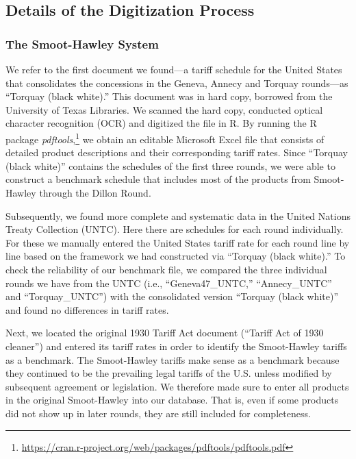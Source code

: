 \documentclass[
  12pt,
]{article}
\begin{document}
\newpage

\hypertarget{digdetails}{%
\subsection{Details of the Digitization Process}\label{digdetails}}

\hypertarget{the-smoot-hawley-system}{%
\subsubsection{The Smoot-Hawley System}\label{the-smoot-hawley-system}}

We refer to the first document we found---a tariff schedule for the United States that consolidates the concessions in the Geneva, Annecy and Torquay rounds---as ``Torquay (black white).'' This document was in hard copy, borrowed from the University of Texas Libraries. We scanned the hard copy, conducted optical character recognition (OCR) and digitized the file in R. By running the R package \emph{pdftools},\footnote{\url{https://cran.r-project.org/web/packages/pdftools/pdftools.pdf}} we obtain an editable Microsoft Excel file that consists of detailed product descriptions and their corresponding tariff rates. Since ``Torquay (black white)'' contains the schedules of the first three rounds, we were able to construct a benchmark schedule that includes most of the products from Smoot-Hawley through the Dillon Round.

Subsequently, we found more complete and systematic data in the United Nations Treaty Collection (UNTC). Here there are schedules for each round individually. For these we manually entered the United States tariff rate for each round line by line based on the framework we had constructed via ``Torquay (black white).'' To check the reliability of our benchmark file, we compared the three individual rounds we have from the UNTC (i.e., ``Geneva47\_UNTC,'' ``Annecy\_UNTC'' and ``Torquay\_UNTC'') with the consolidated version ``Torquay (black white)'' and found no differences in tariff rates.

Next, we located the original 1930 Tariff Act document (``Tariff Act of 1930 cleaner'') and entered its tariff rates in order to identify the Smoot-Hawley tariffs as a benchmark. The Smoot-Hawley tariffs make sense as a benchmark because they continued to be the prevailing legal tariffs of the U.S. unless modified by subsequent agreement or legislation. We therefore made sure to enter all products in the original Smoot-Hawley into our database. That is, even if some products did not show up in later rounds, they are still included for completeness.
\end{document}
